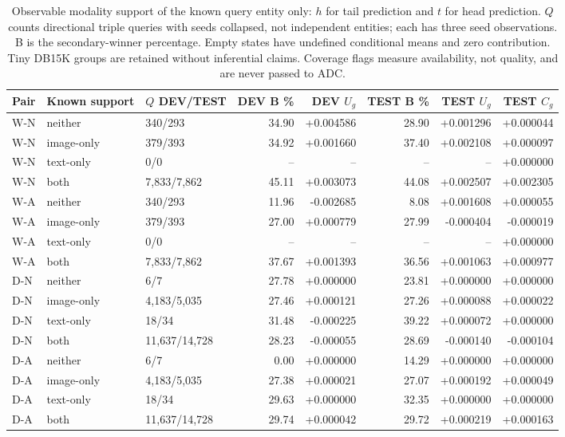 \begin{table}[htbp]
\centering\footnotesize\setlength{\tabcolsep}{3pt}
\caption{Observable modality support of the known query entity only: $h$ for tail prediction and $t$ for head prediction. $Q$ counts directional triple queries with seeds collapsed, not independent entities; each has three seed observations. B is the secondary-winner percentage. Empty states have undefined conditional means and zero contribution. Tiny DB15K groups are retained without inferential claims. Coverage flags measure availability, not quality, and are never passed to ADC.}
\label{tab:complement-support}
\begin{tabular}{lllrrrrr}
\toprule
Pair & Known support & $Q$ DEV/TEST & DEV B \% & DEV $U_g$ & TEST B \% & TEST $U_g$ & TEST $C_g$\\
\midrule
W-N & neither & 340/293 & 34.90 & +0.004586 & 28.90 & +0.001296 & +0.000044\\[2pt]
W-N & image-only & 379/393 & 34.92 & +0.001660 & 37.40 & +0.002108 & +0.000097\\[2pt]
W-N & text-only & 0/0 & -- & -- & -- & -- & +0.000000\\[2pt]
W-N & both & 7,833/7,862 & 45.11 & +0.003073 & 44.08 & +0.002507 & +0.002305\\[2pt]
\midrule
W-A & neither & 340/293 & 11.96 & -0.002685 & 8.08 & +0.001608 & +0.000055\\[2pt]
W-A & image-only & 379/393 & 27.00 & +0.000779 & 27.99 & -0.000404 & -0.000019\\[2pt]
W-A & text-only & 0/0 & -- & -- & -- & -- & +0.000000\\[2pt]
W-A & both & 7,833/7,862 & 37.67 & +0.001393 & 36.56 & +0.001063 & +0.000977\\[2pt]
\midrule
D-N & neither & 6/7 & 27.78 & +0.000000 & 23.81 & +0.000000 & +0.000000\\[2pt]
D-N & image-only & 4,183/5,035 & 27.46 & +0.000121 & 27.26 & +0.000088 & +0.000022\\[2pt]
D-N & text-only & 18/34 & 31.48 & -0.000225 & 39.22 & +0.000072 & +0.000000\\[2pt]
D-N & both & 11,637/14,728 & 28.23 & -0.000055 & 28.69 & -0.000140 & -0.000104\\[2pt]
\midrule
D-A & neither & 6/7 & 0.00 & +0.000000 & 14.29 & +0.000000 & +0.000000\\[2pt]
D-A & image-only & 4,183/5,035 & 27.38 & +0.000021 & 27.07 & +0.000192 & +0.000049\\[2pt]
D-A & text-only & 18/34 & 29.63 & +0.000000 & 32.35 & +0.000000 & +0.000000\\[2pt]
D-A & both & 11,637/14,728 & 29.74 & +0.000042 & 29.72 & +0.000219 & +0.000163\\[2pt]
\bottomrule
\end{tabular}
\end{table}
